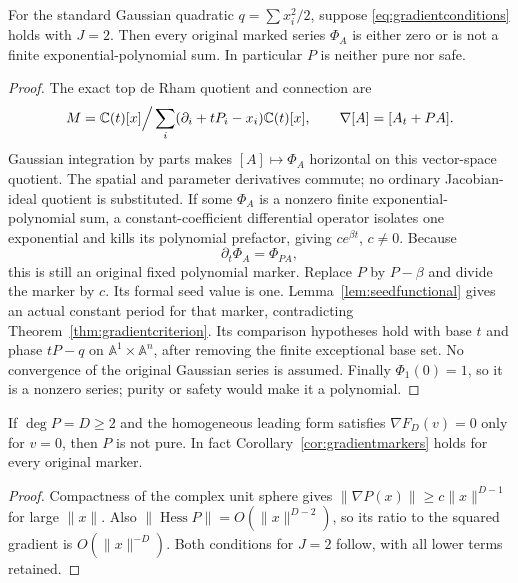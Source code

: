 \begin{corollary}\label{cor:gradientmarkers}
For the standard Gaussian quadratic $q=\sum x_i^2/2$, suppose
\eqref{eq:gradientconditions} holds with $J=2$. Then every original
marked series $\Phi_A$ is either zero or is not a finite
exponential-polynomial sum. In particular $P$ is neither pure nor safe.
\end{corollary}
\begin{proof}
The exact top de Rham quotient and connection are
\[
 M=\mathbb C(t)[x]\Big/\sum_i(\partial_i+tP_i-x_i)\mathbb C(t)[x],
 \qquad\nabla[A]=[A_t+PA].
\]
Gaussian integration by parts makes $[A]\mapsto\Phi_A$ horizontal
on this vector-space quotient. The spatial and parameter derivatives
commute; no ordinary Jacobian-ideal quotient is substituted.
If some $\Phi_A$ is a
nonzero finite exponential-polynomial sum, a constant-coefficient
differential operator isolates one exponential and kills its
polynomial prefactor, giving $c e^{\beta t}$, $c\ne0$.
Because
\[
 \partial_t\Phi_A=\Phi_{PA},
\]
this is still an original fixed polynomial marker. Replace $P$ by
$P-\beta$ and divide the marker by $c$. Its formal seed value is one.
Lemma~\ref{lem:seedfunctional} gives an actual constant period for
that marker, contradicting Theorem~\ref{thm:gradientcriterion}.
Its comparison hypotheses hold with base $t$ and phase $tP-q$ on
$\mathbb A^1\times\mathbb A^n$, after removing the finite exceptional
base set. No convergence of the original Gaussian series is assumed.
Finally $\Phi_1(0)=1$, so it is a nonzero series; purity or safety
would make it a polynomial.
\end{proof}

\begin{corollary}
\label{cor:smoothleading}
If $\deg P=D\geq2$ and the homogeneous leading form satisfies
$\nabla F_D(v)=0$ only for $v=0$, then $P$ is not pure. In fact
Corollary~\ref{cor:gradientmarkers} holds for every original marker.
\end{corollary}
\begin{proof}
Compactness of the complex unit sphere gives
$\|\nabla P(x)\|\geq c\|x\|^{D-1}$ for large $\|x\|$.
Also $\|\operatorname{Hess}P\|=O(\|x\|^{D-2})$, so its ratio to
the squared gradient is $O(\|x\|^{-D})$. Both conditions for $J=2$
follow, with all lower terms retained.
\end{proof}

